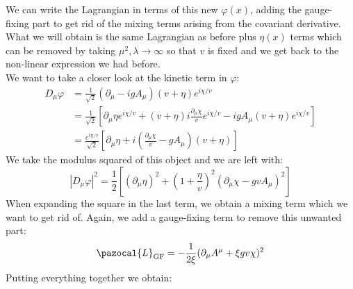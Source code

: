 \documentclass[../main.tex]{subfiles}
\begin{document}
We can write the Lagrangian in terms of this new $\varphi(x)$, adding the gauge-fixing part to get rid of the mixing terms arising from the covariant derivative. What we will obtain is the same Lagrangian as before plus $\eta(x)$ terms which can be removed by taking $\mu^2,\lambda\to\infty$ so that $v$ is fixed and we get back to the non-linear expression we had before.\\
We want to take a closer look at the kinetic term in $\varphi$:
\begin{align*}
D_\mu\varphi&=\frac{1}{\sqrt{2}}(\partial_\mu-igA_\mu)(v+\eta)e^{i\chi/v}\\
&=\frac{1}{\sqrt{2}}\left[\partial_\mu\eta e^{i\chi/v}+(v+\eta)i\frac{\partial_\mu\chi}{v}e^{i\chi/v}-igA_\mu(v+\eta)e^{i\chi/v}\right]\\
&=\frac{e^{i\chi/v}}{\sqrt{2}}\left[\partial_\mu\eta+i\left(\frac{\partial_\mu\chi}{v}-gA_\mu\right)(v+\eta)\right]
\end{align*}
We take the modulus squared of this object and we are left with:
\[
|D_\mu\varphi|^2=\frac{1}{2}\left[(\partial_\mu\eta)^2+\left(1+\frac{\eta}{v}\right)^2(\partial_\mu\chi-gvA_\mu)^2\right]
\]
When expanding the square in the last term, we obtain a mixing term which we want to get rid of. Again, we add a gauge-fixing term to remove this unwanted part:
\[
\pazocal{L}_{\text{GF}}=-\frac{1}{2\xi}(\partial_\mu A^\mu+\xi gv\chi)^2
\]
Putting everything together we obtain:
\end{document}
